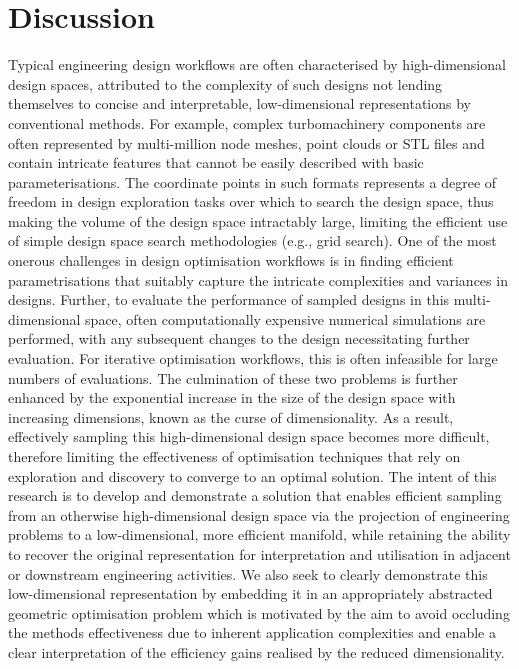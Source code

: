 \documentclass{article}
\begin{document}
\newpage{}

\section{Discussion}
Typical engineering design workflows are often characterised by high-dimensional design spaces, attributed to the complexity of such designs not lending themselves to concise and interpretable, low-dimensional representations by conventional methods. For example, complex turbomachinery components are often represented by multi-million node meshes, point clouds or STL files and contain intricate features that cannot be easily described with basic parameterisations. The coordinate points in such formats represents a degree of freedom in design exploration tasks over which to search the design space, thus making the volume of the design space intractably large, limiting the efficient use of simple design space search methodologies (e.g., grid search). One of the most onerous challenges in design optimisation workflows is in finding efficient parametrisations that suitably capture the intricate complexities and variances in designs. Further, to evaluate the performance of sampled designs in this multi-dimensional space, often computationally expensive numerical simulations are performed, with any subsequent changes to the design necessitating further evaluation. For iterative optimisation workflows, this is often infeasible for large numbers of evaluations. The culmination of these two problems is further enhanced by the exponential increase in the size of the design space with increasing dimensions, known as the curse of dimensionality. As a result, effectively sampling this high-dimensional design space becomes more difficult, therefore limiting the effectiveness of optimisation techniques that rely on exploration and discovery to converge to an optimal solution.
The intent of this research is to develop and demonstrate a solution that enables efficient sampling from an otherwise high-dimensional design space via the projection of engineering problems to a low-dimensional, more efficient manifold, while retaining the ability to recover the original representation for interpretation and utilisation in adjacent or downstream engineering activities. We also seek to clearly demonstrate this low-dimensional representation by embedding it in an appropriately abstracted geometric optimisation problem which is motivated by the aim to avoid occluding the methods effectiveness due to inherent application complexities and enable a clear interpretation of the efficiency gains realised by the reduced dimensionality.
\end{document}
